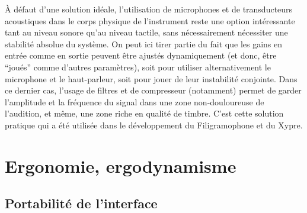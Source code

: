 \indent À défaut d'une solution idéale, l'utilisation de microphones et de transducteurs acoustiques dans le corps physique de l'instrument reste une option intéressante tant au niveau sonore qu'au niveau tactile, sans nécessairement nécessiter une stabilité absolue du système. On peut ici tirer partie du fait que les gains en entrée comme en sortie peuvent être ajustés dynamiquement (et donc, être ``joués'' comme d'autres paramètres), soit pour utiliser alternativement le microphone et le haut-parleur, soit pour jouer de leur instabilité conjointe. Dans ce dernier cas, l'usage de filtres et de compresseur (notamment) permet de garder l'amplitude et la fréquence du signal dans une zone non-douloureuse de l'audition, et même, une zone riche en qualité de timbre. C'est cette solution pratique qui a été utilisée dans le développement du Filigramophone et du Xypre.


\section{Ergonomie, ergodynamisme}
\label{sec:interfaces:ergonomy}

\subsection{Portabilité de l'interface}
\label{sec:interfaces:ergonomy:portability}

